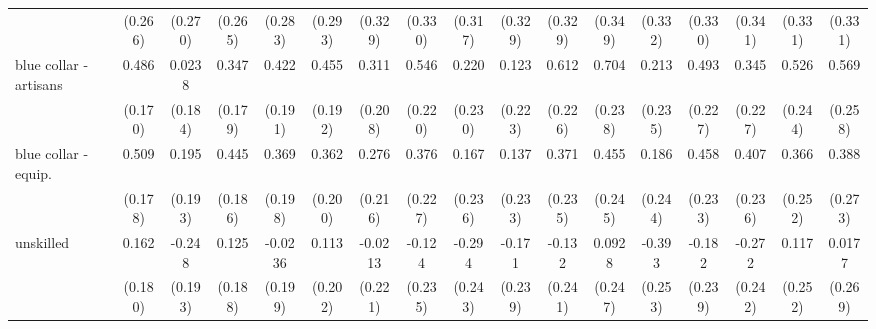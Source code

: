 {\begin{tabular}{l*{16}{c}}
                    &     (0.266)         &     (0.270)         &     (0.265)         &     (0.283)         &     (0.293)         &     (0.329)         &     (0.330)         &     (0.317)         &     (0.329)         &     (0.329)         &     (0.349)         &     (0.332)         &     (0.330)         &     (0.341)         &     (0.331)         &     (0.331)         \\
[1em]
blue collar - artisans&       0.486\sym{**} &      0.0238         &       0.347         &       0.422\sym{*}  &       0.455\sym{*}  &       0.311         &       0.546\sym{*}  &       0.220         &       0.123         &       0.612\sym{**} &       0.704\sym{**} &       0.213         &       0.493\sym{*}  &       0.345         &       0.526\sym{*}  &       0.569\sym{*}  \\
                    &     (0.170)         &     (0.184)         &     (0.179)         &     (0.191)         &     (0.192)         &     (0.208)         &     (0.220)         &     (0.230)         &     (0.223)         &     (0.226)         &     (0.238)         &     (0.235)         &     (0.227)         &     (0.227)         &     (0.244)         &     (0.258)         \\
[1em]
blue collar - equip.&       0.509\sym{**} &       0.195         &       0.445\sym{*}  &       0.369         &       0.362         &       0.276         &       0.376         &       0.167         &       0.137         &       0.371         &       0.455         &       0.186         &       0.458\sym{*}  &       0.407         &       0.366         &       0.388         \\
                    &     (0.178)         &     (0.193)         &     (0.186)         &     (0.198)         &     (0.200)         &     (0.216)         &     (0.227)         &     (0.236)         &     (0.233)         &     (0.235)         &     (0.245)         &     (0.244)         &     (0.233)         &     (0.236)         &     (0.252)         &     (0.273)         \\
[1em]
unskilled           &       0.162         &      -0.248         &       0.125         &     -0.0236         &       0.113         &     -0.0213         &      -0.124         &      -0.294         &      -0.171         &      -0.132         &      0.0928         &      -0.393         &      -0.182         &      -0.272         &       0.117         &      0.0177         \\
                    &     (0.180)         &     (0.193)         &     (0.188)         &     (0.199)         &     (0.202)         &     (0.221)         &     (0.235)         &     (0.243)         &     (0.239)         &     (0.241)         &     (0.247)         &     (0.253)         &     (0.239)         &     (0.242)         &     (0.252)         &     (0.269)         \\

\end{tabular}}
